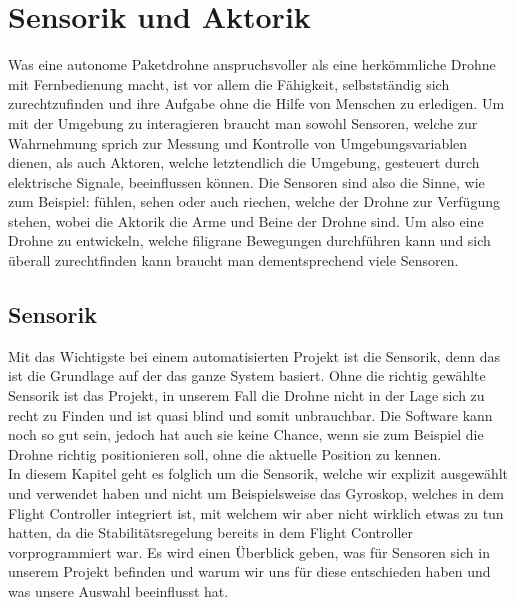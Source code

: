\chapter{Sensorik und Aktorik}
Was eine autonome Paketdrohne anspruchsvoller als eine herkömmliche Drohne mit Fernbedienung macht, ist vor allem die Fähigkeit, selbstständig sich zurechtzufinden und ihre Aufgabe ohne die Hilfe von Menschen zu erledigen. Um mit der Umgebung zu interagieren braucht man sowohl Sensoren, welche zur Wahrnehmung sprich zur Messung und Kontrolle von Umgebungsvariablen dienen, als auch Aktoren, welche letztendlich die Umgebung, gesteuert durch elektrische Signale, beeinflussen können. Die Sensoren sind also die Sinne, wie zum Beispiel: fühlen, sehen oder auch riechen, welche der Drohne zur Verfügung stehen, wobei die Aktorik die Arme und Beine der Drohne sind. Um also eine Drohne zu entwickeln, welche filigrane Bewegungen durchführen kann und sich überall zurechtfinden kann braucht man dementsprechend viele Sensoren. 


\section{Sensorik}
Mit das Wichtigste bei einem automatisierten Projekt ist die Sensorik, denn das ist die Grundlage auf der das ganze System basiert. Ohne die richtig gewählte Sensorik ist das Projekt, in unserem Fall die Drohne nicht in der Lage sich zu recht zu Finden und ist quasi blind und somit unbrauchbar. Die Software kann noch so gut sein, jedoch hat auch sie keine Chance, wenn sie zum Beispiel die Drohne richtig positionieren soll, ohne die aktuelle Position zu kennen.\\

In diesem Kapitel geht es folglich um die Sensorik, welche wir explizit ausgewählt und verwendet haben und nicht um Beispielsweise das Gyroskop, welches in dem Flight Controller integriert ist, mit welchem wir aber nicht wirklich etwas zu tun hatten, da die Stabilitätsregelung bereits in dem Flight Controller vorprogrammiert war. Es wird einen Überblick geben, was für Sensoren sich in unserem Projekt befinden und warum wir uns für diese entschieden haben und was unsere Auswahl beeinflusst hat.

